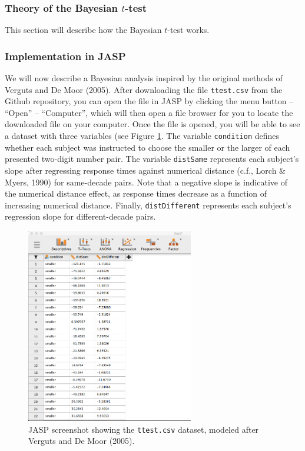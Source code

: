 \documentclass[english,,doc,floatsintext]{apa6}
\begin{document}
\hypertarget{theory-of-the-bayesian-t-test}{%
\subsubsection{\texorpdfstring{Theory of the Bayesian \(t\)-test}{Theory of the Bayesian t-test}}\label{theory-of-the-bayesian-t-test}}

This section will describe how the Bayesian \(t\)-test works.

\hypertarget{implementation-in-jasp}{%
\subsubsection{Implementation in JASP}\label{implementation-in-jasp}}

We will now describe a Bayesian analysis inspired by the original methods of Verguts and De Moor (2005). After downloading the file \texttt{ttest.csv} from the Github repository, you can open the file in JASP by clicking the menu button -- \enquote{Open} -- \enquote{Computer}, which will then open a file browser for you to locate the downloaded file on your computer. Once the file is opened, you will be able to see a dataset with three variables (see Figure \ref{fig:ttestData}. The variable \texttt{condition} defines whether each subject was instructed to choose the smaller or the larger of each presented two-digit number pair. The variable \texttt{distSame} represents each subject's slope after regressing response times against numerical distance (c.f., Lorch \& Myers, 1990) for same-decade pairs. Note that a negative slope is indicative of the numerical distance effect, as response times decrease as a function of increasing numerical distance. Finally, \texttt{distDifferent} represents each subject's regression slope for different-decade pairs.

\begin{figure}
\centering
\includegraphics[width=0.65\textwidth,height=\textheight]{figures/ttestData.png}
\caption{\label{fig:ttestData}JASP screenshot showing the \texttt{ttest.csv} dataset, modeled after Verguts and De Moor (2005).}
\end{figure}
\end{document}
